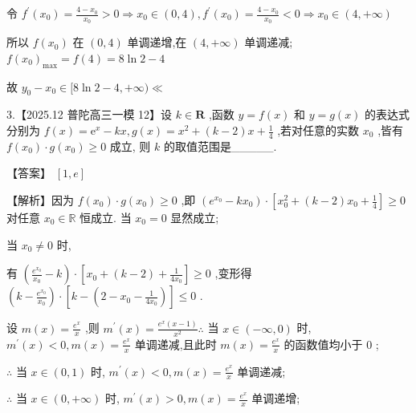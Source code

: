 \documentclass[10pt]{article}
\newcommand*\circled[1]{\tikz[baseline=(char.base)]{\node[shape=circle,draw,inner sep=1.5pt] (char) {\small #1};}}
\begin{document}
令 \({f}^{\prime }\left( {x}_{0}\right)  = \frac{4 - {x}_{0}}{{x}_{0}} > 0 \Rightarrow  {x}_{0} \in  \left( {0,4}\right) ,{f}^{\prime }\left( {x}_{0}\right)  = \frac{4 - {x}_{0}}{{x}_{0}} < 0 \Rightarrow  {x}_{0} \in  \left( {4, + \infty }\right)\)

所以 \(f\left( {x}_{0}\right)\) 在 \(\left( {0,4}\right)\) 单调递增,在 \(\left( {4, + \infty }\right)\) 单调递减; \(f{\left( {x}_{0}\right) }_{\max } = f\left( 4\right)  = 8\ln 2 - 4\)

故 \({y}_{0} - {x}_{0} \in  \lbrack 8\ln 2 - 4, + \infty ) \ll\)

3.【2025.12 普陀高三一模 12】设 \(k \in  \mathbf{R}\) ,函数 \(y = f\left( x\right)\) 和 \(y = g\left( x\right)\) 的表达式分别为 \(f\left( x\right)  = {\mathrm{e}}^{x} - {kx},g\left( x\right)  = {x}^{2} + \left( {k - 2}\right) x + \frac{1}{4}\) ,若对任意的实数 \({x}_{0}\) ,皆有 \(f\left( {x}_{0}\right)  \cdot  g\left( {x}_{0}\right)  \geq  0\) 成立, 则 \(k\) 的取值范围是\_\_\_\_\_.

【答案】 \(\left\lbrack  {1,e}\right\rbrack\)

【解析】因为 \(f\left( {x}_{0}\right)  \cdot  g\left( {x}_{0}\right)  \geq  0\) ,即 \(\left( {{e}^{{x}_{0}} - k{x}_{0}}\right)  \cdot  \left\lbrack  {{x}_{0}^{2} + \left( {k - 2}\right) {x}_{0} + \frac{1}{4}}\right\rbrack   \geq  0\) 对任意 \({x}_{0} \in  \mathbb{R}\) 恒成立. 当 \({x}_{0} = 0\) 显然成立;

当 \({x}_{0} \neq  0\) 时,

有 \(\left( {\frac{{e}^{{x}_{0}}}{{x}_{0}} - k}\right)  \cdot  \left\lbrack  {{x}_{0} + \left( {k - 2}\right)  + \frac{1}{4{x}_{0}}}\right\rbrack   \geq  0\) ,变形得 \(\left( {k - \frac{{e}^{{x}_{0}}}{{x}_{0}}}\right)  \cdot  \left\lbrack  {k - \left( {2 - {x}_{0} - \frac{1}{4{x}_{0}}}\right) }\right\rbrack   \leq  0\)  \circled{1} .

设 \(m\left( x\right)  = \frac{{e}^{x}}{x}\) ,则 \({m}^{\prime }\left( x\right)  = \frac{{e}^{x}\left( {x - 1}\right) }{{x}^{2}}\therefore\) 当 \(x \in  \left( {-\infty ,0}\right)\) 时, \({m}^{\prime }\left( x\right)  < 0,m\left( x\right)  = \frac{{e}^{x}}{x}\) 单调递减,且此时 \(m\left( x\right)  = \frac{{e}^{x}}{x}\) 的函数值均小于 0 ;

\(\therefore\) 当 \(x \in  \left( {0,1}\right)\) 时, \({m}^{\prime }\left( x\right)  < 0,m\left( x\right)  = \frac{{e}^{x}}{x}\) 单调递减;

\(\therefore\) 当 \(x \in  \left( {0, + \infty }\right)\) 时, \({m}^{\prime }\left( x\right)  > 0,m\left( x\right)  = \frac{{e}^{x}}{x}\) 单调递增;
\end{document}
